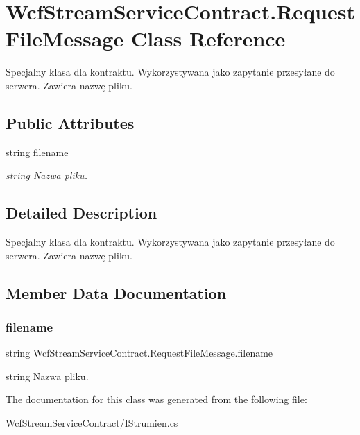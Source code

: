 \hypertarget{class_wcf_stream_service_contract_1_1_request_file_message}{}\section{Wcf\+Stream\+Service\+Contract.\+Request\+File\+Message Class Reference}
\label{class_wcf_stream_service_contract_1_1_request_file_message}


Specjalny klasa dla kontraktu. Wykorzystywana jako zapytanie przesyłane do serwera. Zawiera nazwę pliku.  


\subsection*{Public Attributes}
\begin{DoxyCompactItemize}
\item 
string \hyperlink{class_wcf_stream_service_contract_1_1_request_file_message_ae17e2b0c27fd70c9fbb88e91793728c0}{filename}
\begin{DoxyCompactList}\small\item\em string Nazwa pliku. \end{DoxyCompactList}\end{DoxyCompactItemize}


\subsection{Detailed Description}
Specjalny klasa dla kontraktu. Wykorzystywana jako zapytanie przesyłane do serwera. Zawiera nazwę pliku. 



\subsection{Member Data Documentation}
\mbox{\label{class_wcf_stream_service_contract_1_1_request_file_message_ae17e2b0c27fd70c9fbb88e91793728c0}} 
\subsubsection{\texorpdfstring{filename}{filename}}
{\footnotesize\ttfamily string Wcf\+Stream\+Service\+Contract.\+Request\+File\+Message.\+filename}



string Nazwa pliku. 



The documentation for this class was generated from the following file\+:\begin{DoxyCompactItemize}
\item 
Wcf\+Stream\+Service\+Contract/I\+Strumien.\+cs\end{DoxyCompactItemize}
